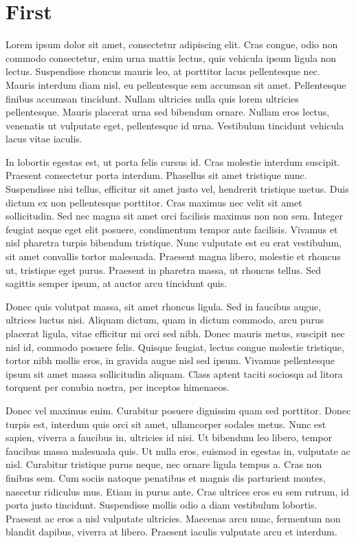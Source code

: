 \section{First}


Lorem ipsum dolor sit amet, consectetur adipiscing elit. Cras congue, odio non commodo consectetur, enim urna mattis lectus, quis vehicula ipsum ligula non lectus. Suspendisse rhoncus mauris leo, at porttitor lacus pellentesque nec. Mauris interdum diam nisl, eu pellentesque sem accumsan sit amet. Pellentesque finibus accumsan tincidunt. Nullam ultricies nulla quis lorem ultricies pellentesque. Mauris placerat urna sed bibendum ornare. Nullam eros lectus, venenatis ut vulputate eget, pellentesque id urna. Vestibulum tincidunt vehicula lacus vitae iaculis.

In lobortis egestas est, ut porta felis cursus id. Cras molestie interdum suscipit. Praesent consectetur porta interdum. Phasellus sit amet tristique nunc. Suspendisse nisi tellus, efficitur sit amet justo vel, hendrerit tristique metus. Duis dictum ex non pellentesque porttitor. Cras maximus nec velit sit amet sollicitudin. Sed nec magna sit amet orci facilisis maximus non non sem. Integer feugiat neque eget elit posuere, condimentum tempor ante facilisis. Vivamus et nisl pharetra turpis bibendum tristique. Nunc vulputate est eu erat vestibulum, sit amet convallis tortor malesuada. Praesent magna libero, molestie et rhoncus ut, tristique eget purus. Praesent in pharetra massa, ut rhoncus tellus. Sed sagittis semper ipsum, at auctor arcu tincidunt quis.

Donec quis volutpat massa, sit amet rhoncus ligula. Sed in faucibus augue, ultrices luctus nisi. Aliquam dictum, quam in dictum commodo, arcu purus placerat ligula, vitae efficitur mi orci sed nibh. Donec mauris metus, suscipit nec nisl id, commodo posuere felis. Quisque feugiat, lectus congue molestie tristique, tortor nibh mollis eros, in gravida augue nisl sed ipsum. Vivamus pellentesque ipsum sit amet massa sollicitudin aliquam. Class aptent taciti sociosqu ad litora torquent per conubia nostra, per inceptos himenaeos.

Donec vel maximus enim. Curabitur posuere dignissim quam sed porttitor. Donec turpis est, interdum quis orci sit amet, ullamcorper sodales metus. Nunc est sapien, viverra a faucibus in, ultricies id nisi. Ut bibendum leo libero, tempor faucibus massa malesuada quis. Ut nulla eros, euismod in egestas in, vulputate ac nisl. Curabitur tristique purus neque, nec ornare ligula tempus a. Cras non finibus sem. Cum sociis natoque penatibus et magnis dis parturient montes, nascetur ridiculus mus. Etiam in purus ante. Cras ultrices eros eu sem rutrum, id porta justo tincidunt. Suspendisse mollis odio a diam vestibulum lobortis. Praesent ac eros a nisl vulputate ultricies. Maecenas arcu nunc, fermentum non blandit dapibus, viverra at libero. Praesent iaculis vulputate arcu et interdum.

